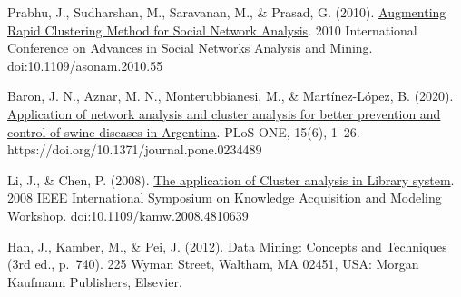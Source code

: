 \documentclass[3p,twocolumn]{elsarticle}
\begin{document}
\begin{thebibliography}{X}
 Prabhu, J., Sudharshan, M., Saravanan, M., \& Prasad, G. (2010). \href{https://ieeexplore.ieee.org/document/5563072} {Augmenting Rapid Clustering Method for Social Network Analysis}. 2010 International Conference on Advances in Social Networks Analysis and Mining. doi:10.1109/asonam.2010.55

 Baron, J. N., Aznar, M. N., Monterubbianesi, M., \& Martínez-López, B. (2020). \href{https://search.ebscohost.com/login.aspx?direct=true&db=aph&AN=143827917&lang=es&site=ehost-live&scope=site} {Application of network analysis and cluster analysis for better prevention and control of swine diseases in Argentina}. PLoS ONE, 15(6), 1–26. https://doi.org/10.1371/journal.pone.0234489

 Li, J., \& Chen, P. (2008). \href{https://ieeexplore.ieee.org/document/4810639} {The application of Cluster analysis in Library system}. 2008 IEEE International Symposium on Knowledge Acquisition and Modeling Workshop. doi:10.1109/kamw.2008.4810639



Han, J., Kamber, M., \& Pei, J. (2012). Data Mining: Concepts and Techniques (3rd ed., p.~740). 225 Wyman Street, Waltham, MA 02451, USA: Morgan Kaufmann Publishers, Elsevier.

\end{thebibliography}
\end{document}
